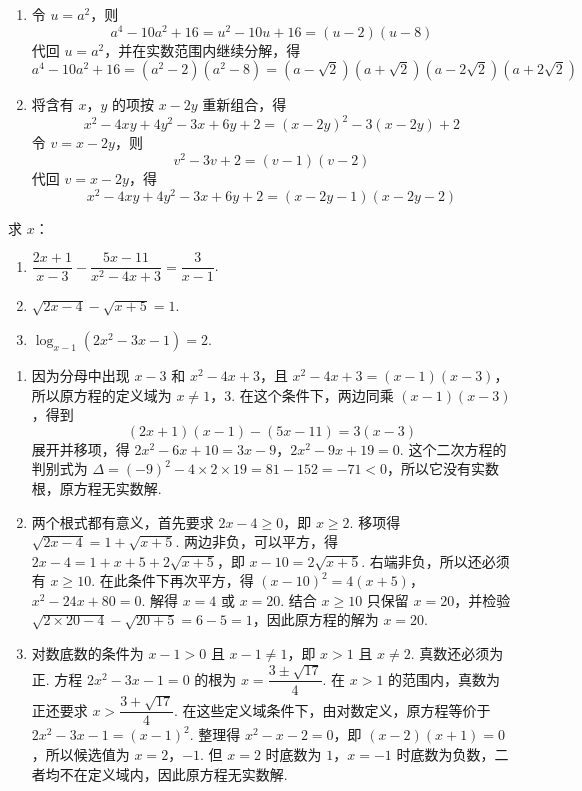 \begin{solution}
\begin{enumerate}
\item 令 \(u=a^2\)，则
\[
a^4-10a^2+16=u^2-10u+16=\left(u-2\right)\left(u-8\right)
\]
代回 \(u=a^2\)，并在实数范围内继续分解，得
\[
a^4-10a^2+16=\left(a^2-2\right)\left(a^2-8\right)
=\left(a-\sqrt2\right)\left(a+\sqrt2\right)\left(a-2\sqrt2\right)\left(a+2\sqrt2\right)
\]

\item 将含有 \(x\)，\(y\) 的项按 \(x-2y\) 重新组合，得
\[
x^2-4xy+4y^2-3x+6y+2
=\left(x-2y\right)^2-3\left(x-2y\right)+2
\]
令 \(v=x-2y\)，则
\[
v^2-3v+2=\left(v-1\right)\left(v-2\right)
\]
代回 \(v=x-2y\)，得
\[
x^2-4xy+4y^2-3x+6y+2=\left(x-2y-1\right)\left(x-2y-2\right)
\]
\end{enumerate}
\end{solution}

\begin{problem}
求 \(x\)：

\begin{enumerate}
\item \(\dfrac{2x+1}{x-3}-\dfrac{5x-11}{x^2-4x+3}=\dfrac3{x-1}\).
\item \(\sqrt{2x-4}-\sqrt{x+5}=1\).
\item \(\log_{x-1}\left(2x^2-3x-1\right)=2\).
\end{enumerate}
\end{problem}

\begin{solution}
\begin{enumerate}
\item 因为分母中出现 \(x-3\) 和 \(x^2-4x+3\)，且 \(x^2-4x+3=\left(x-1\right)\left(x-3\right)\)，所以原方程的定义域为 \(x\ne1\)，\(3\). 在这个条件下，两边同乘 \(\left(x-1\right)\left(x-3\right)\)，得到
\[
\left(2x+1\right)\left(x-1\right)-\left(5x-11\right)=3\left(x-3\right)
\]
展开并移项，得
\(2x^2-6x+10=3x-9\)，\(2x^2-9x+19=0\).
这个二次方程的判别式为 \(\Delta=(-9)^2-4\times2\times19=81-152=-71<0\)，所以它没有实数根，原方程无实数解.

\item 两个根式都有意义，首先要求 \(2x-4\geqslant0\)，即 \(x\geqslant2\). 移项得 \(\sqrt{2x-4}=1+\sqrt{x+5}\). 两边非负，可以平方，得 \(2x-4=1+x+5+2\sqrt{x+5}\)，即 \(x-10=2\sqrt{x+5}\). 右端非负，所以还必须有 \(x\geqslant10\). 在此条件下再次平方，得
\(\left(x-10\right)^2=4\left(x+5\right)\)，\(x^2-24x+80=0\).
解得 \(x=4\) 或 \(x=20\). 结合 \(x\geqslant10\) 只保留 \(x=20\)，并检验 \(\sqrt{2\times20-4}-\sqrt{20+5}=6-5=1\)，因此原方程的解为 \(x=20\).

\item 对数底数的条件为 \(x-1>0\) 且 \(x-1\ne1\)，即 \(x>1\) 且 \(x\ne2\). 真数还必须为正. 方程 \(2x^2-3x-1=0\) 的根为 \(x=\dfrac{3\pm\sqrt{17}}{4}\). 在 \(x>1\) 的范围内，真数为正还要求 \(x>\dfrac{3+\sqrt{17}}4\). 在这些定义域条件下，由对数定义，原方程等价于 \(2x^2-3x-1=\left(x-1\right)^2\). 整理得 \(x^2-x-2=0\)，即 \(\left(x-2\right)\left(x+1\right)=0\)，所以候选值为 \(x=2\)，\(-1\). 但 \(x=2\) 时底数为 \(1\)，\(x=-1\) 时底数为负数，二者均不在定义域内，因此原方程无实数解.
\end{enumerate}
\end{solution}

